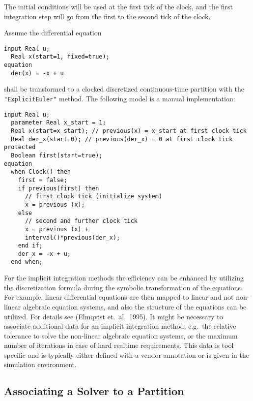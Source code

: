 The initial conditions will be used at the first tick of the clock, and
the first integration step will go from the first to the second tick of
the clock.

\begin{example}
Assume the differential equation
\begin{lstlisting}[language=modelica]
  input Real u;
  Real x(start=1, fixed=true);
equation
  der(x) = -x + u
\end{lstlisting}
shall be transformed to a clocked discretized continuous-time partition with the \lstinline!"ExplicitEuler"! method.  The following model is a manual implementation:
\begin{lstlisting}[language=modelica]
  input Real u;
  parameter Real x_start = 1;
  Real x(start=x_start); // previous(x) = x_start at first clock tick
  Real der_x(start=0); // previous(der_x) = 0 at first clock tick
protected
  Boolean first(start=true);
equation
  when Clock() then
    first = false;
    if previous(first) then
      // first clock tick (initialize system)
      x = previous (x);
    else
      // second and further clock tick
      x = previous (x) +
      interval()*previous(der_x);
    end if;
    der_x = -x + u;
  end when;
\end{lstlisting}
\end{example}

\begin{nonnormative}
For the implicit integration methods the efficiency can be enhanced by utilizing the discretization formula during the symbolic transformation of the equations.  For example,
linear differential equations are then mapped to linear and not non-linear algebraic equation systems, and also the structure of the equations can be utilized.  For details see
(Elmqvist et.~al.\ 1995).  It might be necessary to associate additional data for an implicit integration method, e.g.\ the relative tolerance to solve the non-linear algebraic
equation systems, or the maximum number of iterations in case of hard realtime requirements.  This data is tool specific and is typically either defined with a vendor annotation
or is given in the simulation environment.
\end{nonnormative}

\subsection{Associating a Solver to a Partition}\label{associating-a-solver-to-a-partition}

